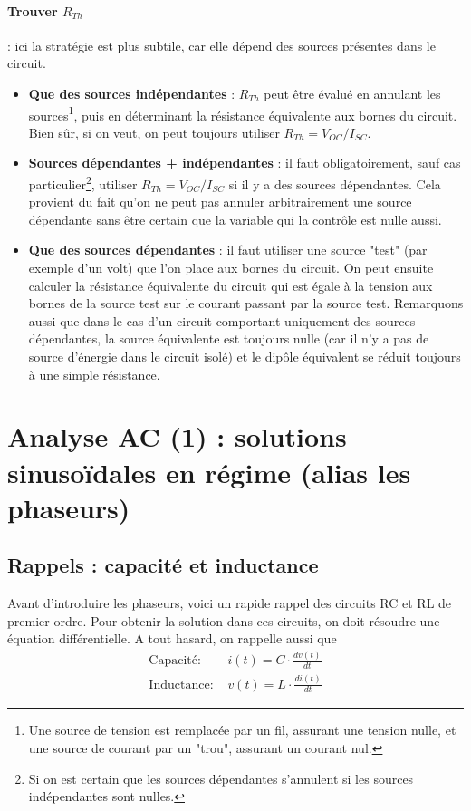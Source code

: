 \paragraph{Trouver $R_{Th}$} : ici la stratégie est plus subtile, car elle dépend des sources présentes dans le circuit.
\begin{itemize}
\item \textbf{Que des sources indépendantes} : $R_{Th}$ peut être évalué en annulant les sources\footnote{Une source de tension est remplacée par un fil, assurant une tension nulle, et une source de courant par un "trou", assurant un courant nul.}, puis en déterminant la résistance équivalente aux bornes du circuit. Bien sûr, si on veut, on peut toujours utiliser $R_{Th} = V_{OC}/I_{SC}$.
\item \textbf{Sources dépendantes + indépendantes} : il faut obligatoirement, sauf cas particulier\footnote{Si on est certain que les sources dépendantes s'annulent si les sources indépendantes sont nulles.}, utiliser $R_{Th} = V_{OC}/I_{SC}$ si il y a des sources dépendantes. Cela provient du fait qu'on ne peut pas annuler arbitrairement une source dépendante sans être certain que la variable qui la contrôle est nulle aussi.
\item \textbf{Que des sources dépendantes} : il faut utiliser une source "test" (par exemple d'un volt) que l'on place aux bornes du circuit. On peut ensuite calculer la résistance équivalente du circuit qui est égale à la tension aux bornes de la source test sur le courant passant par la source test. Remarquons aussi que dans le cas d'un circuit comportant uniquement des sources dépendantes, la source équivalente est toujours nulle (car il n'y a pas de source d'énergie dans le circuit isolé) et le dipôle équivalent se réduit toujours à une simple résistance.
\end{itemize}

\section{Analyse AC (1) : solutions sinusoïdales en régime (alias les phaseurs)}
\subsection{Rappels : capacité et inductance}
Avant d'introduire les phaseurs, voici un rapide rappel des circuits RC et RL de premier ordre. Pour obtenir la solution dans ces circuits, on doit résoudre une équation différentielle. A tout hasard, on rappelle aussi que
\begin{align}
\text{Capacité: }& i(t) = C\cdot \frac{dv(t)}{dt}\label{C}\\
\text{Inductance: }& v(t) = L\cdot \frac{di(t)}{dt}\label{L}
\end{align}

